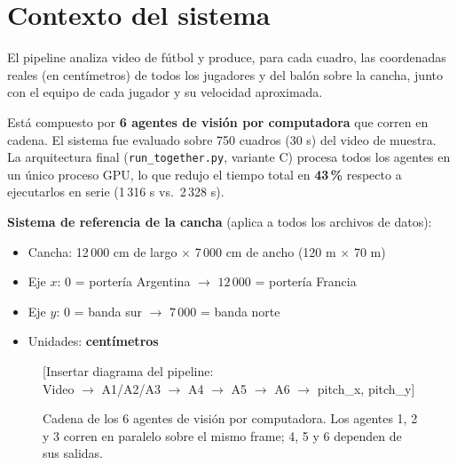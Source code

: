 \documentclass[11pt,a4paper]{article}
\begin{document}
\section{Contexto del sistema}

El pipeline analiza video de fútbol y produce, para cada cuadro,
las coordenadas reales (en centímetros) de todos los jugadores y del balón
sobre la cancha, junto con el equipo de cada jugador y su velocidad aproximada.

Está compuesto por \textbf{6 agentes de visión por computadora} que corren
en cadena. El sistema fue evaluado sobre 750 cuadros (30 s) del video de muestra.
La arquitectura final (\texttt{run\_together.py}, variante C) procesa todos los
agentes en un único proceso GPU, lo que redujo el tiempo total en \textbf{43\,\%}
respecto a ejecutarlos en serie (1\,316 s vs.\ 2\,328 s).

\begin{notabox}
\textbf{Sistema de referencia de la cancha} (aplica a todos los archivos de datos):
\begin{itemize}[noitemsep]
  \item Cancha: 12\,000 cm de largo $\times$ 7\,000 cm de ancho (120 m $\times$ 70 m)
  \item Eje $x$: $0$ = portería Argentina \quad $\longrightarrow$ \quad $12\,000$ = portería Francia
  \item Eje $y$: $0$ = banda sur \quad $\longrightarrow$ \quad $7\,000$ = banda norte
  \item Unidades: \textbf{centímetros}
\end{itemize}
\end{notabox}

\begin{figure}[H]
  \centering
  \begin{mdframed}[
    linecolor=gray!40, linewidth=1pt,
    innertopmargin=50pt, innerbottommargin=50pt,
    backgroundcolor=gray!8
  ]
    \centering\color{gray!60}
    \large [Insertar diagrama del pipeline: \\
    Video $\to$ A1/A2/A3 $\to$ A4 $\to$ A5 $\to$ A6 $\to$ pitch\_x, pitch\_y]
  \end{mdframed}
  \caption{Cadena de los 6 agentes de visión por computadora.
           Los agentes 1, 2 y 3 corren en paralelo sobre el mismo frame;
           4, 5 y 6 dependen de sus salidas.}
  \label{fig:pipeline}
\end{figure}
\end{document}

